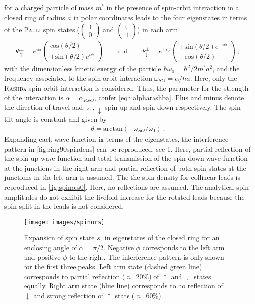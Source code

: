 for a charged particle of mass $m^*$ in the presence of spin-orbit interaction in a closed ring of radius $a$ in polar coordinates \cite{PhysRevB.73.155325} 
leads to the four eigenstates in terms of the \textsc{Pauli} spin states ($\begin{pmatrix}1\\0\end{pmatrix}$ and $\begin{pmatrix}0\\1\end{pmatrix}$) in each arm \cite{nitta1999.695}
\begin{align}
  \Psi^{\pm}_{\uparrow} = e^{i\phi}\begin{pmatrix}\text{cos}(\theta/2)\\\pm\text{sin}(\theta/2)e^{i\phi}\end{pmatrix} 
  \qquad\text{and}\qquad
  \Psi^{\pm}_{\downarrow} = e^{\pm i\phi}\begin{pmatrix}\pm\text{sin}(\theta/2)e^{-i\phi}\\-\text{cos}(\theta/2)\end{pmatrix}\ ,
\end{align}
with the dimensionless kinetic energy of the particle $\hbar\omega_0=\hbar^2/2m^*a^2$, and the frequency associated to the spin-orbit interaction $\omega_{SO} = \alpha/\hbar a$. Here, only the \textsc{Rashba} spin-orbit interaction is considered. Thus, the parameter for the strength of the interaction is $\alpha = \alpha_{RSO}$, confer \cref{eqn:alpharashba}. Plus and minus denote the direction of travel and $\uparrow,\downarrow$ spin up and spin down respectively. The spin tilt angle is constant and given by \cite{PhysRevB.71.033309}
\begin{align}
\theta = \text{arctan}(-\omega_{SO}/\omega_0)\ .
\end{align}
Expanding each wave function in terms of the eigenstates, the interference pattern in \cref{fig:ring90spindens} can be reproduced, see \cref{fig:spinors}. Here, partial reflection of the spin-up wave function and total transmission of the spin-down wave function at the junctions in the right arm and partial reflection of both spin states at the junctions in the left arm is assumed. The the spin density for collinear leads is reproduced in \cref{fig:spinors0}. Here, no reflections are assumed. The analytical spin amplitudes do not exhibit the fivefold increase for the rotated leads because the spin split in the leads is not considered.\par
\begin{figure}[!h]
  \centering
  \texttt{[image: images/spinors]}
  \caption{Expansion of spin state $s_z$ in eigenstates of the closed ring for an enclosing angle of $\alpha = \pi/2$. Negative $\phi$ corresponds to the left arm and positive $\phi$ to the right. The interference pattern is only shown for the first three peaks. Left arm state (dashed green line) corresponds to partial reflection ($\approx$ 20\%) of $\uparrow$ and $\downarrow$ states equally. Right arm state (blue line) corresponds to no reflection of $\downarrow$ and strong reflection of $\uparrow$ state ($\approx$ 60\%).}\label{fig:spinors}
\end{figure}
